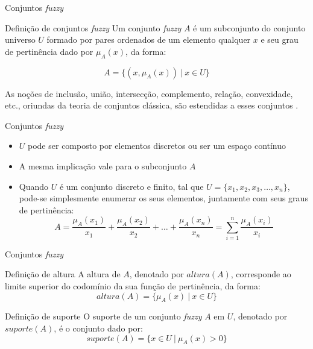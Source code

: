 \begin{frame}{Conjuntos \emph{fuzzy}}

\begin{block}{Definição de conjuntos \emph{fuzzy}}
Um conjunto \emph{fuzzy} $A$ é um subconjunto do conjunto universo $U$ formado por pares ordenados de um elemento qualquer $x$ e seu grau de pertinência dado por $\mu_A(x)$, da forma:

\begin{equation*}
  A =  \{(x, \mu_A(x)) \ |\ x \in U\}
\end{equation*}
\end{block}

As noções de inclusão, união, intersecção, complemento, relação, convexidade, etc., oriundas da teoria de conjuntos clássica, são estendidas a esses conjuntos \citep{zadeh:65}.

\end{frame}

\begin{frame}{Conjuntos \emph{fuzzy}}
\begin{itemize}
    \item $U$ pode ser composto por elementos discretos ou ser um espaço contínuo
    \item A mesma implicação vale para o subconjunto $A$
    \item Quando $U$ é um conjunto discreto e finito, tal que $U = \{x_1, x_2, x_3, \ldots, x_n\}$, pode-se simplesmente enumerar os seus elementos, juntamente com seus graus de pertinência:
\begin{equation*}
  A =  \frac{\mu_A(x_1)}{x_1} + \frac{\mu_A(x_2)}{x_2} + \ldots + \frac{\mu_A(x_n)}{x_n} = \sum_{i=1}^n \frac{\mu_A(x_i)}{x_i}
\end{equation*}
\end{itemize}

\end{frame}

\begin{frame}{Conjuntos \emph{fuzzy}}
\begin{block}{Definição de altura}
A altura de $A$, denotado por $altura(A)$, corresponde ao limite superior do codomínio da sua função de pertinência, da forma:
\begin{equation*}
  altura(A) = \{\mu_A(x) \ |\ x \in U\}
\label{equ:conjunto_fuzzy_altura}
\end{equation*}
\end{block}

\begin{block}{Definição de suporte}
O suporte de um conjunto \emph{fuzzy} $A$ em $U$, denotado por $suporte(A)$, é o conjunto dado por:
\begin{equation*}
  suporte(A) = \{x \in U \ |\ \mu_A(x) > 0 \}
\end{equation*}
\end{block}

\end{frame}

